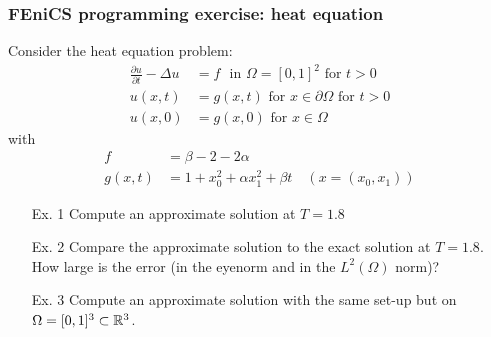 \begin{frame}
  \frametitle{FEniCS programming exercise: heat equation}

  Consider the heat equation problem:
  \begin{align*}
    \frac{\partial u}{\partial t} - \Delta u &= f
    \,\, \mbox{ in } \Omega =  [0, 1]^2 \text{ for } t > 0 \\
    u(x, t) &= g(x, t) \text{ for } x \in \partial \Omega \text{ for } t > 0 \\
    u(x, 0) &= g(x, 0) \text{ for } x \in \Omega
  \end{align*}
  with
  \begin{align*}
    f &= \beta - 2 - 2 \alpha \\
    g(x, t) &= 1 + x_0^2 + \alpha x_1^2 + \beta t \quad (x = (x_0, x_1))
  \end{align*}

  \begin{enumerate}
  \item[Ex. 1]
    Compute an approximate solution at $T = 1.8$
  \item[Ex. 2] Compare the approximate solution to the exact solution
    at $T = 1.8$. How large is the error (in the eyenorm and in the
    $L^2(\Omega)$ norm)?
  \item[Ex. 3] Compute an approximate solution with the same set-up
    but on $\Omega = [0, 1]^3 \subset \mathbb{R}^3$.
  \end{enumerate}

\end{frame}
